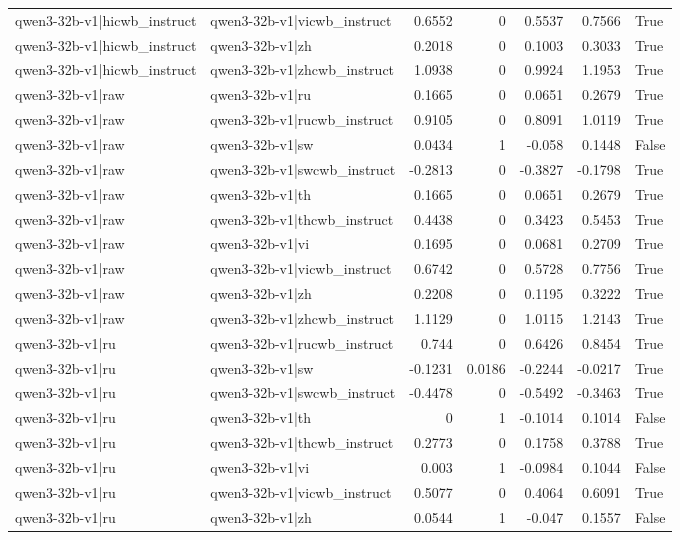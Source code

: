 \begin{table}
\begin{tabular}{l l r r r r l}
qwen3-32b-v1|hicwb_instruct & qwen3-32b-v1|vicwb_instruct & 0.6552 & 0 & 0.5537 & 0.7566 & True \\
qwen3-32b-v1|hicwb_instruct & qwen3-32b-v1|zh & 0.2018 & 0 & 0.1003 & 0.3033 & True \\
qwen3-32b-v1|hicwb_instruct & qwen3-32b-v1|zhcwb_instruct & 1.0938 & 0 & 0.9924 & 1.1953 & True \\
qwen3-32b-v1|raw & qwen3-32b-v1|ru & 0.1665 & 0 & 0.0651 & 0.2679 & True \\
qwen3-32b-v1|raw & qwen3-32b-v1|rucwb_instruct & 0.9105 & 0 & 0.8091 & 1.0119 & True \\
qwen3-32b-v1|raw & qwen3-32b-v1|sw & 0.0434 & 1 & -0.058 & 0.1448 & False \\
qwen3-32b-v1|raw & qwen3-32b-v1|swcwb_instruct & -0.2813 & 0 & -0.3827 & -0.1798 & True \\
qwen3-32b-v1|raw & qwen3-32b-v1|th & 0.1665 & 0 & 0.0651 & 0.2679 & True \\
qwen3-32b-v1|raw & qwen3-32b-v1|thcwb_instruct & 0.4438 & 0 & 0.3423 & 0.5453 & True \\
qwen3-32b-v1|raw & qwen3-32b-v1|vi & 0.1695 & 0 & 0.0681 & 0.2709 & True \\
qwen3-32b-v1|raw & qwen3-32b-v1|vicwb_instruct & 0.6742 & 0 & 0.5728 & 0.7756 & True \\
qwen3-32b-v1|raw & qwen3-32b-v1|zh & 0.2208 & 0 & 0.1195 & 0.3222 & True \\
qwen3-32b-v1|raw & qwen3-32b-v1|zhcwb_instruct & 1.1129 & 0 & 1.0115 & 1.2143 & True \\
qwen3-32b-v1|ru & qwen3-32b-v1|rucwb_instruct & 0.744 & 0 & 0.6426 & 0.8454 & True \\
qwen3-32b-v1|ru & qwen3-32b-v1|sw & -0.1231 & 0.0186 & -0.2244 & -0.0217 & True \\
qwen3-32b-v1|ru & qwen3-32b-v1|swcwb_instruct & -0.4478 & 0 & -0.5492 & -0.3463 & True \\
qwen3-32b-v1|ru & qwen3-32b-v1|th & 0 & 1 & -0.1014 & 0.1014 & False \\
qwen3-32b-v1|ru & qwen3-32b-v1|thcwb_instruct & 0.2773 & 0 & 0.1758 & 0.3788 & True \\
qwen3-32b-v1|ru & qwen3-32b-v1|vi & 0.003 & 1 & -0.0984 & 0.1044 & False \\
qwen3-32b-v1|ru & qwen3-32b-v1|vicwb_instruct & 0.5077 & 0 & 0.4064 & 0.6091 & True \\
qwen3-32b-v1|ru & qwen3-32b-v1|zh & 0.0544 & 1 & -0.047 & 0.1557 & False \\

\end{tabular}
\end{table}
